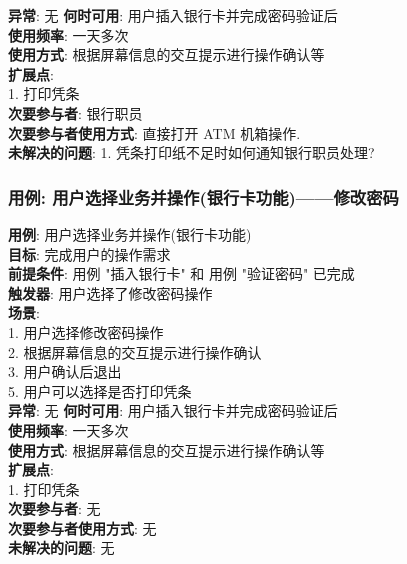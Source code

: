 \documentclass[UTF8]{article}
\begin{document}
\textbf{异常}: 无
\textbf{何时可用}: 用户插入银行卡并完成密码验证后
\\
\textbf{使用频率}: 一天多次
\\
\textbf{使用方式}: 根据屏幕信息的交互提示进行操作确认等
\\
\textbf{扩展点}: \\
	\hspace*{2em}1. 打印凭条 \\
\textbf{次要参与者}: 银行职员
\\
\textbf{次要参与者使用方式}: 直接打开 ATM 机箱操作.
\\
\textbf{未解决的问题}: 
	\hspace*{2em} 1. 凭条打印纸不足时如何通知银行职员处理? \\
			
\subsubsection{用例: 用户选择业务并操作(银行卡功能)——修改密码}
\noindent
\textbf{用例}: 用户选择业务并操作(银行卡功能)
\\
\textbf{目标}: 完成用户的操作需求
\\
\textbf{前提条件}: 用例 "插入银行卡" 和 用例 "验证密码" 已完成
\\
\textbf{触发器}: 用户选择了修改密码操作
\\
\textbf{场景}: \\
	\hspace*{2em}1. 用户选择修改密码操作 \\
	\hspace*{2em}2. 根据屏幕信息的交互提示进行操作确认 \\
	\hspace*{2em}3. 用户确认后退出 \\
	\hspace*{2em} 5. 用户可以选择是否打印凭条 \\
	
\textbf{异常}: 无
\textbf{何时可用}: 用户插入银行卡并完成密码验证后
\\
\textbf{使用频率}: 一天多次
\\
\textbf{使用方式}: 根据屏幕信息的交互提示进行操作确认等
\\
\textbf{扩展点}: \\
	\hspace*{2em}1. 打印凭条 \\
\textbf{次要参与者}: 无
\\
\textbf{次要参与者使用方式}: 无
\\
\textbf{未解决的问题}: 无
	
\end{document}
